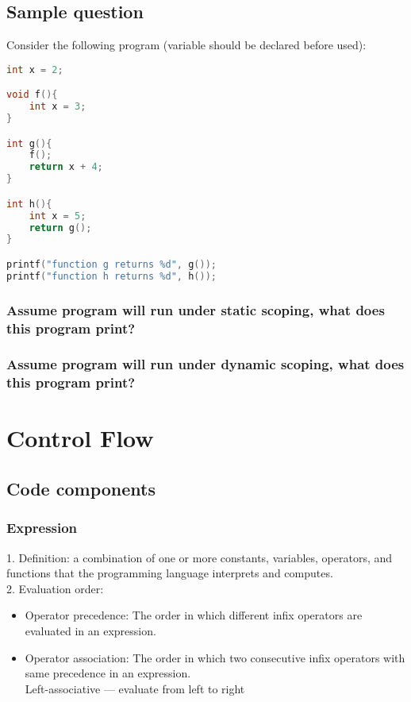 \documentclass[11pt]{article}
\begin{document}
\subsection{Sample question}
Consider the following program (variable should be declared before used):
\begin{lstlisting}[mathescape, language=c++]
int x = 2;

void f(){
    int x = 3;
}

int g(){
    f();
    return x + 4;
}

int h(){
    int x = 5;
    return g();
}

printf("function g returns %d", g());
printf("function h returns %d", h());
\end{lstlisting}
\subsubsection{Assume program will run under static scoping, what does this program print?}
\iffalse
\textbf{Solution:} \\
function g returns 6
function h returns 6
\fi
\subsubsection{Assume program will run under dynamic scoping, what does this program print?}
\iffalse
\textbf{Solution:} \\
function g returns 6
function h returns 9
\fi

\section{Control Flow}
\subsection{Code components}
\subsubsection{Expression}
1. Definition: a combination of one or more constants, variables, operators, and functions that the programming language interprets and computes.\\
2. Evaluation order:
\begin{itemize}
\item Operator precedence: The order in which different infix operators are evaluated in an expression.
\item Operator association: The order in which two consecutive infix operators with same precedence in an expression.\\
	Left-associative --- evaluate from left to right
\end{itemize}
\end{document}
